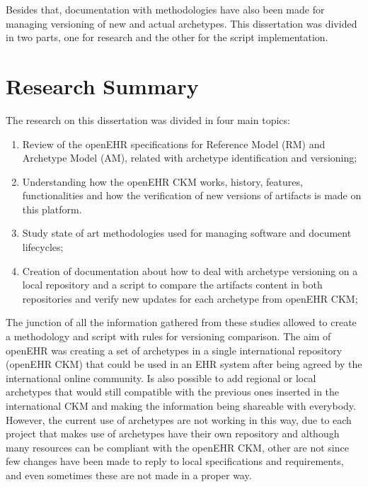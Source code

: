 \documentclass[mim_thesis.tex]{subfiles}
\begin{document}
Besides that, documentation with methodologies have also been made for managing versioning of new and actual archetypes. This dissertation was divided in two parts, one for research and the other for the script implementation. 



\section{Research Summary}

The research on this dissertation was divided in four main topics: 
\begin{enumerate}[noitemsep]
\item  Review of the openEHR specifications for Reference Model (RM) and 
Archetype Model (AM), related with archetype identification and versioning; 

\item Understanding how the openEHR CKM works, history, features, functionalities and how the verification of new versions of artifacts is made on this platform.

\item Study state of art methodologies used for managing software and document lifecycles;

\item Creation of documentation about how to deal with archetype versioning on a local repository and a script to compare the artifacts content in both repositories and verify new updates for each archetype from openEHR CKM; 

\end{enumerate}

The junction of all the information gathered from these studies allowed to 
create a methodology and script with rules for versioning comparison. The aim of openEHR was creating a set of archetypes in a single international repository (openEHR CKM) that could be used in an EHR system after being agreed by the international online community. Is also possible to add regional or local archetypes that would still compatible with the previous ones inserted in the international CKM and making the information being shareable with everybody. However, the current use of archetypes are not working in this way, due to each project that makes use of archetypes have their own repository and although many resources can be compliant with the openEHR CKM, other are not since few changes have been made to reply to local specifications and requirements, and even sometimes these are not made in a proper way. 
\end{document}
